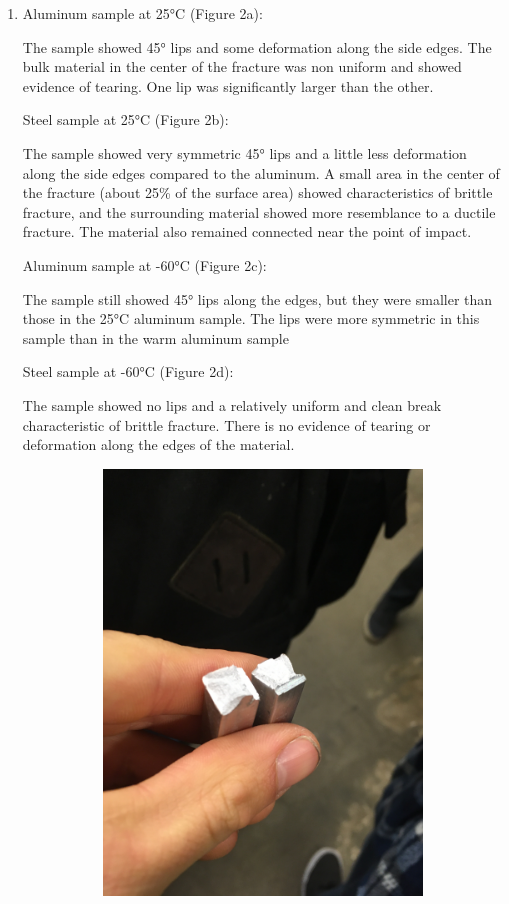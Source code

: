 \documentclass{article}
\begin{document}
\begin{enumerate}
\item Aluminum sample at \ang{25}C (Figure 2a):
\begin{addmargin}{2em}
	The sample showed \ang{45} lips and some deformation along the side edges. The bulk material in the center of the fracture was non uniform and showed evidence of tearing. One lip was significantly larger than the other.
\end{addmargin}
Steel sample at \ang{25}C (Figure 2b):
\begin{addmargin}{2em}
	The sample showed very symmetric \ang{45} lips and a little less deformation along the side edges compared to the aluminum. A small area in the center of the fracture (about 25\% of the surface area) showed characteristics of brittle fracture, and the surrounding material showed more resemblance to a ductile fracture. The material also remained connected near the point of impact.
\end{addmargin}
Aluminum sample at \ang{-60}C (Figure 2c):
\begin{addmargin}{2em}
	The sample still showed \ang{45} lips along the edges, but they were smaller than those in the \ang{25}C aluminum sample. The lips were more symmetric in this sample than in the warm aluminum sample
\end{addmargin}
Steel sample at \ang{-60}C (Figure 2d):
\begin{addmargin}{2em}
	The sample showed no lips and a relatively uniform and clean break characteristic of brittle fracture. There is no evidence of tearing or deformation along the edges of the material.
\end{addmargin}
\begin{figure}[H]
\caption{Steel and Aluminum Fracture Surfaces}
\begin{subfigure}{.5\textwidth}
\centering
\includegraphics[width=.8\linewidth]{Al25}

\end{subfigure}
\end{figure}
\end{enumerate}
\end{document}
